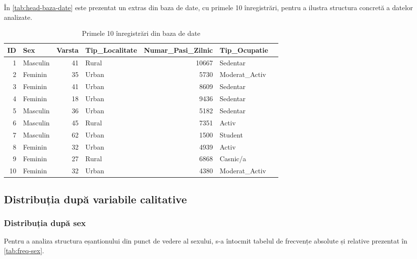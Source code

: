 \documentclass[12pt,a4paper]{report}
\begin{document}
În \autoref{tab:head-baza-date} este prezentat un extras din baza de date, cu primele 10 înregistrări, pentru a ilustra structura concretă a datelor analizate.

\begin{table}[h!]
    \centering
    \caption{Primele 10 înregistrări din baza de date}
    \label{tab:head-baza-date}
    \begin{tabular}{r l r l r l r}
        \hline
        ID & Sex & Varsta & Tip\_Localitate & Numar\_Pasi\_Zilnic & Tip\_Ocupatie \\
        \hline
         1 & Masculin & 41 & Rural & 10667 & Sedentar      \\
         2 & Feminin  & 35 & Urban &  5730 & Moderat\_Activ\\
         3 & Feminin  & 41 & Urban &  8609 & Sedentar      \\
         4 & Feminin  & 18 & Urban &  9436 & Sedentar      \\
         5 & Masculin & 36 & Urban &  5182 & Sedentar      \\
         6 & Masculin & 45 & Rural &  7351 & Activ         \\
         7 & Masculin & 62 & Urban &  1500 & Student       \\
         8 & Feminin  & 32 & Urban &  4939 & Activ         \\
         9 & Feminin  & 27 & Rural &  6868 & Casnic/a      \\
        10 & Feminin  & 32 & Urban &  4380 & Moderat\_Activ\\
        \hline
    \end{tabular}
\end{table}

\pagebreak

\subsection{Distribuția după variabile calitative}

\subsubsection{Distribuția după sex}

Pentru a analiza structura eșantionului din punct de vedere al sexului, s-a întocmit tabelul de frecvențe absolute și relative prezentat în \autoref{tab:freq-sex}.
\end{document}
